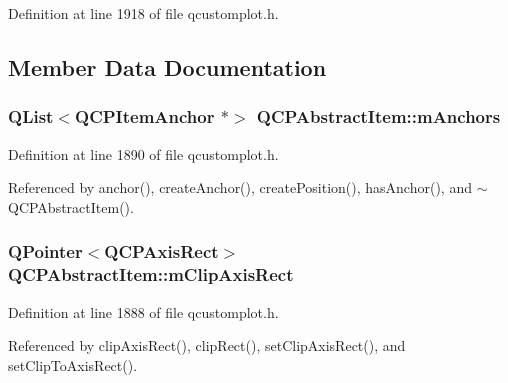 Definition at line 1918 of file qcustomplot.\+h.



\subsection{Member Data Documentation}
\hypertarget{class_q_c_p_abstract_item_a0e1e082dc04ef832411a23905d83cc02}{}
\subsubsection[{m\+Anchors}]{\setlength{\rightskip}{0pt plus 5cm}Q\+List$<${\bf Q\+C\+P\+Item\+Anchor} $\ast$$>$ Q\+C\+P\+Abstract\+Item\+::m\+Anchors\hspace{0.3cm}{\ttfamily [protected]}}\label{class_q_c_p_abstract_item_a0e1e082dc04ef832411a23905d83cc02}


Definition at line 1890 of file qcustomplot.\+h.



Referenced by anchor(), create\+Anchor(), create\+Position(), has\+Anchor(), and $\sim$\+Q\+C\+P\+Abstract\+Item().

\hypertarget{class_q_c_p_abstract_item_a3e57cfe7da4b1ac3d6fa7281ea437361}{}
\subsubsection[{m\+Clip\+Axis\+Rect}]{\setlength{\rightskip}{0pt plus 5cm}Q\+Pointer$<${\bf Q\+C\+P\+Axis\+Rect}$>$ Q\+C\+P\+Abstract\+Item\+::m\+Clip\+Axis\+Rect\hspace{0.3cm}{\ttfamily [protected]}}\label{class_q_c_p_abstract_item_a3e57cfe7da4b1ac3d6fa7281ea437361}


Definition at line 1888 of file qcustomplot.\+h.



Referenced by clip\+Axis\+Rect(), clip\+Rect(), set\+Clip\+Axis\+Rect(), and set\+Clip\+To\+Axis\+Rect().

\hypertarget{class_q_c_p_abstract_item_ad2a70ff6b658fcb84a9427f69d3f587d}{}
